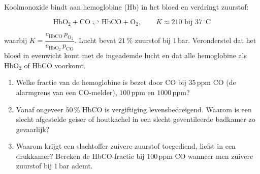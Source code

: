 \begin{oefening}
Koolmonoxide bindt aan hemoglobine (Hb) in het bloed en verdringt zuurstof:

\[
\mathrm{HbO_2 + CO \rightleftharpoons HbCO + O_2}, \qquad K \approx 210 \text{ bij } 37\,^\circ\mathrm{C}
\]

waarbij \(K = \dfrac{c_{\mathrm{HbCO}}\,p_{\mathrm{O_2}}}{c_{\mathrm{HbO_2}}\,p_{\mathrm{CO}}}\). Lucht bevat \(21\,\%\) zuurstof bij \(1\,\mathrm{bar}\). Veronderstel dat het bloed in evenwicht komt met de ingeademde lucht en dat alle hemoglobine als \(\mathrm{HbO_2}\) of HbCO voorkomt.

\begin{enumerate}
\item[(a)]
  Welke fractie van de hemoglobine is bezet door CO bij \(35\,\mathrm{ppm}\) CO (de alarmgrens van een CO-melder), \(100\,\mathrm{ppm}\) en \(1000\,\mathrm{ppm}\)?
\item[(b)]
  Vanaf ongeveer \(50\,\%\) HbCO is vergiftiging levensbedreigend. Waarom is een slecht afgestelde geiser of houtkachel in een slecht geventileerde badkamer zo gevaarlijk?
\item[(c)]
  Waarom krijgt een slachtoffer zuivere zuurstof toegediend, liefst in een drukkamer? Bereken de HbCO-fractie bij \(100\,\mathrm{ppm}\) CO wanneer men zuivere zuurstof bij \(1\,\mathrm{bar}\) ademt.
\end{enumerate}
\end{oefening}
